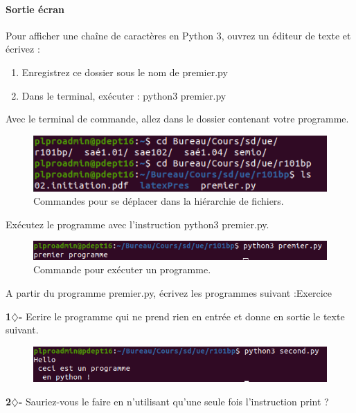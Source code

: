 \paragraph{Sortie écran}
Pour afficher une chaîne de caractères en Python 3, ouvrez un éditeur de texte et
écrivez :




\begin{enumerate}
    \item Enregistrez ce dossier sous le nom de premier.py
    \item Dans le terminal, exécuter : python3 premier.py
\end{enumerate}

Avec le terminal de commande, allez dans le dossier contenant votre programme.

    \begin{figure}[H]
    \centering
    \includegraphics[scale = 0.7]{chapitre1/figures/premier.png}
    \caption{Commandes pour se déplacer dans la hiérarchie de fichiers.}
    \label{fig:enter-label}
\end{figure}

Exécutez le programme avec l'instruction python3 premier.py.

\begin{figure}[H]
    \centering
    \includegraphics[scale = 0.7]{chapitre1/figures/premier2.png}
    \caption{Commande pour  exécuter un programme.}
\end{figure}



\begin{tcolorbox}[lefttitle=2cm, colframe=gray!75!black, title= \textbf{Exercices}]
A partir du programme premier.py, écrivez les programmes suivant :Exercice


\textbf{1$\diamondsuit$-}
Ecrire le programme  qui ne prend rien en entrée et donne en sortie le texte suivant.
\begin{figure}[H]
    \centering
    \includegraphics[scale=0.6]{chapitre1/figures/second.png}
\end{figure}
\textbf{2$\diamondsuit$-}
Sauriez-vous le faire en n'utilisant qu'une seule fois l'instruction print ?
\end{tcolorbox}

